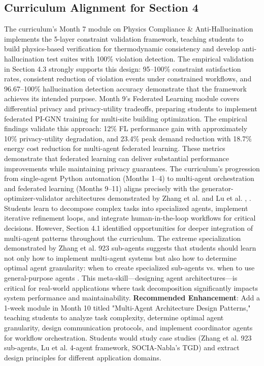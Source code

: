 \documentclass[12pt,a4paper]{article}
\begin{document}
\subsection{Curriculum Alignment for Section 4}
The curriculum's Month 7 module on Physics Compliance \& Anti-Hallucination implements the 5-layer constraint validation framework, teaching students to build physics-based verification for thermodynamic consistency and develop anti-hallucination test suites with 100\% violation detection. The empirical validation in Section 4.3 strongly supports this design: 95--100\% constraint satisfaction rates, consistent reduction of violation events under constrained workflows, and 96.67--100\% hallucination detection accuracy demonstrate that the framework achieves its intended purpose.
Month 9's Federated Learning module covers differential privacy and privacy-utility tradeoffs, preparing students to implement federated PI-GNN training for multi-site building optimization. The empirical findings validate this approach: 12\% FL performance gain with approximately 10\% privacy-utility degradation, and 23.4\% peak demand reduction with 18.7\% energy cost reduction for multi-agent federated learning. These metrics demonstrate that federated learning can deliver substantial performance improvements while maintaining privacy guarantees.
The curriculum's progression from single-agent Python automation (Months 1--4) to multi-agent orchestration and federated learning (Months 9--11) aligns precisely with the generator-optimizer-validator architectures demonstrated by Zhang et al. and Lu et al. \cite{ref123}, \cite{ref36}. Students learn to decompose complex tasks into specialized agents, implement iterative refinement loops, and integrate human-in-the-loop workflows for critical decisions.
However, Section 4.1 identified opportunities for deeper integration of multi-agent patterns throughout the curriculum. The extreme specialization demonstrated by Zhang et al. 923 sub-agents suggests that students should learn not only how to implement multi-agent systems but also how to determine optimal agent granularity: when to create specialized sub-agents vs. when to use general-purpose agents \cite{ref123}. This meta-skill---designing agent architectures---is critical for real-world applications where task decomposition significantly impacts system performance and maintainability.
\textbf{Recommended Enhancement}: Add a 1-week module in Month 10 titled "Multi-Agent Architecture Design Patterns," teaching students to analyze task complexity, determine optimal agent granularity, design communication protocols, and implement coordinator agents for workflow orchestration. Students would study case studies (Zhang et al. 923 sub-agents, Lu et al. 4-agent framework, SOCIA-Nabla's TGD) and extract design principles for different application domains.
\end{document}
